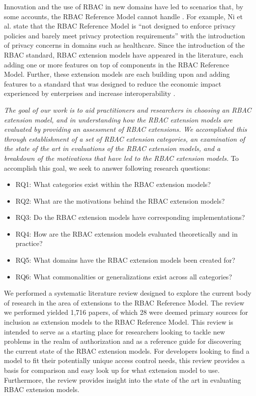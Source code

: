 Innovation and the use of RBAC in new domains have led to scenarios that, by some accounts, the RBAC Reference Model cannot handle \cite{kuhn2010adding}.  
For example, Ni et al. \cite{ni2010privacy} state that the RBAC Reference Model is ``not designed to enforce privacy policies and barely 
meet privacy protection requirements'' with the introduction of privacy concerns in domains such as healthcare. 
Since the introduction of the RBAC standard, RBAC extension models have appeared in the literature, each adding one or more features on top of components in the RBAC Reference Model.
Further, these extension models are each building upon and adding features to a standard that was designed to reduce the economic impact experienced by enterprises and increase interoperability \cite{o20102010}.

\textit{The goal of our work is to aid practitioners and researchers in choosing an RBAC extension model, and in understanding
how the RBAC extension models are evaluated by providing an assessment of RBAC extensions. We accomplished this through 
establishment of a set of RBAC extension categories, an examination of the state of the art in evaluations of the RBAC extension models, and a breakdown of the motivations that have led to the RBAC extension models.} To accomplish this goal, we seek to answer following research questions:

\begin{itemize}
\setlength{\itemsep}{0.25pt}
\item RQ1: What categories exist within the RBAC extension models?
\item RQ2: What are the motivations behind the RBAC extension models?
\item RQ3: Do the RBAC extension models have corresponding implementations?
\item RQ4: How are the RBAC extension models evaluated theoretically and in practice?
\item RQ5: What domains have the RBAC extension models been created for?
\item RQ6: What commonalities or generalizations exist across all categories?
\end{itemize}

We performed a systematic literature review designed to explore the current body of research in the area of extensions to the RBAC Reference Model. 
The review we performed yielded 1,716 papers, of which 28 were deemed primary sources for inclusion as extension models to the RBAC Reference Model.  
This review is intended to serve as a starting place for researchers looking to tackle new problems in the realm of authorization and as a reference guide for discovering
the current state of the RBAC extension models. 
For developers looking to find a model to fit their potentially unique access control needs, this review provides a basis for comparison and easy look up for what extension model to use.  
Furthermore, the review provides insight into the state of the art in evaluating RBAC extension models.

